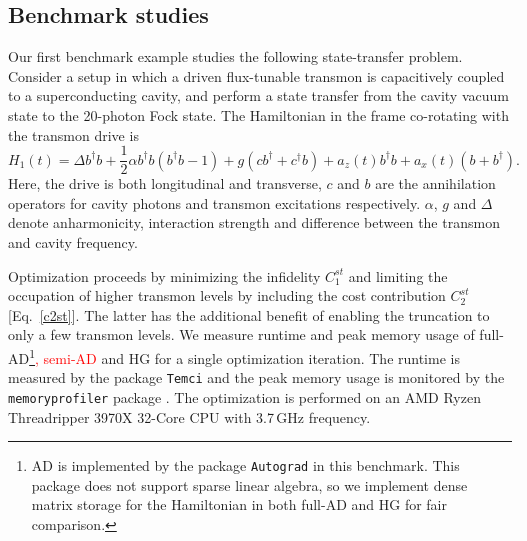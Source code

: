 \documentclass[letterpaper,10pt]{iopart}
\newcommand\revise[1]{\textcolor{red}{#1}}
\begin{document}
\subsection{Benchmark studies}
Our first benchmark example studies the following state-transfer problem. Consider a setup in which a driven flux-tunable transmon is capacitively coupled to a superconducting cavity, and perform a state transfer from the cavity vacuum state to the 20-photon Fock state. The Hamiltonian in the frame co-rotating with the transmon drive is
\begin{equation}
\label{fockH}
    H_1(t)=\Delta b^\dagger b+\frac{1}{2}\alpha b^\dagger b(b^\dagger b-1)+g(cb^\dagger+c^\dagger b)+a_{z}(t)b^\dagger b
    +a_{x}(t)(b+b^\dagger).
\end{equation}
Here, the drive is both longitudinal and transverse,  $c$ and $b$ are the annihilation operators for cavity photons and transmon excitations respectively. $\alpha$, $g$ and $\Delta$ denote anharmonicity, interaction strength and difference between the transmon and cavity frequency. 
 
Optimization proceeds by minimizing the infidelity $C_1^{st}$ and limiting the occupation of higher transmon levels by including the cost contribution $C_2^{st}$ [Eq.\ \eqref{c2st}]. The latter has the additional benefit of enabling the truncation to only a few transmon levels. We measure runtime and peak memory usage of full-AD\footnote{AD is implemented by the package \texttt{Autograd} \cite{maclaurin2015autograd} in this benchmark. This package does not support sparse linear algebra, so we implement dense matrix storage for the Hamiltonian in both full-AD and HG for fair comparison.}\revise{, semi-AD} and HG for a single optimization iteration. The runtime is measured by the package \texttt{Temci} \cite{temci} and
the peak memory usage is monitored by the \texttt{memory\textunderscore profiler} package \cite{memory}. The optimization is performed on an AMD Ryzen Threadripper 3970X 32-Core CPU with 3.7\,GHz frequency. 
\end{document}
